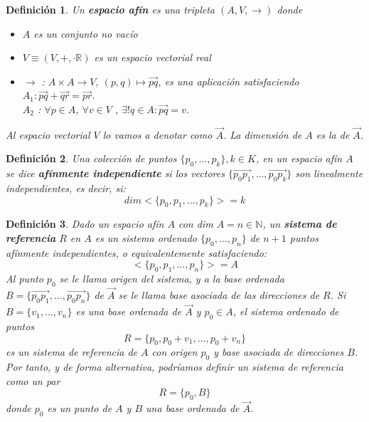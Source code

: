 \documentclass[a4paper,11pt, oneside]{book}
\newtheorem{defi}{Definición}
\begin{document}
\begin{defi}
	Un \textbf{espacio afín} es una tripleta $(A, V, \rightarrow)$ donde
	\begin{itemize}
		\item $A$ es un conjunto no vacío
		\item $V \equiv (V, +, \cdot \mathbb R)$ es un espacio vectorial real
		\item $\rightarrow$ : $A \times A \rightarrow V$, $(p,q) \mapsto \overrightarrow{pq}$, es una aplicación satisfaciendo \\
		$A_1 : \overrightarrow{pq} + \overrightarrow{qr} = \overrightarrow{pr}$.  \\
		$A_2$ : $\forall p \in A$, $\forall v \in V$ , $\exists! q \in A : \overrightarrow{pq} = v$.
	\end{itemize}
	Al espacio vectorial $V$ lo vamos a denotar como $\overrightarrow{A}$. La dimensión de $A$ es la de $\overrightarrow{A}$.
\end{defi}
\begin{defi}
	Una colección de puntos $\{p_0,...,p_k\}, k \in K$, en un espacio afín $A$ se dice \textbf{afínmente independiente} si los vectores $\{\overrightarrow{p_0p_1},...,\overrightarrow{p_0p_k}\}$ son linealmente independientes, es decir, si:
	\begin{equation}
	dim<\{p_0,p_1,...,p_k\}> = k
	\end{equation}
\end{defi}
\begin{defi}
	Dado un espacio afín $A$ con dim $A = n \in \mathbb N$, un \textbf{sistema de referencia} $R$ en $A$ es un sistema ordenado $\{p_0, ..., p_n\}$ de $n+1$ puntos afínmente independientes, o equivalentemente satisfaciendo:
	\begin{equation}
	<\{p_0,p_1,...,p_n\}> = A
	\end{equation}
	Al punto $p_0$ se le llama origen del sistema, y a la base ordenada \\$B = \{\overrightarrow{p_0p_1}, ..., \overrightarrow{p_0p_n}\}$ de $\overrightarrow{A}$ se le llama base asociada de las direcciones de $R$.
	Si $B = \{v_1,...,v_n\}$ es una base ordenada de $\overrightarrow{A}$ y $p_0 \in A$, el sistema ordenado de puntos
	\begin{equation}
	R = \{p_0, p_0+v_1, ..., p_0+v_n\}
	\end{equation}
	es un sistema de referencia de $A$ con origen $p_0$ y base asociada de direcciones $B$. Por tanto, y de forma alternativa, podríamos definir un sistema de referencia como un par
	\begin{equation}
	R = \{p_0, B\}
	\end{equation}
	donde $p_0$ es un punto de $A$ y $B$ una base ordenada de $\overrightarrow{A}$.
\end{defi}
\end{document}
